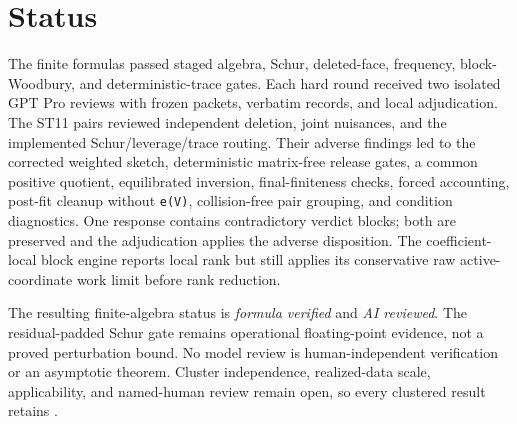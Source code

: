 \documentclass[11pt]{article}
\begin{document}
\section{Status}

The finite formulas passed staged algebra, Schur, deleted-face, frequency,
block-Woodbury, and deterministic-trace gates. Each hard round received two
isolated GPT Pro reviews with frozen packets, verbatim records, and local
adjudication. The ST11 pairs reviewed independent deletion, joint nuisances,
and the implemented Schur/leverage/trace routing. Their adverse findings led
to the corrected weighted sketch, deterministic matrix-free release gates, a
common positive quotient, equilibrated inversion, final-finiteness checks,
forced accounting, post-fit cleanup without \texttt{e(V)}, collision-free pair
grouping, and condition diagnostics. One response contains contradictory
verdict blocks; both are preserved and the adjudication applies the adverse
disposition. The coefficient-local block engine reports local rank but still
applies its conservative raw active-coordinate work limit before rank
reduction.

The resulting finite-algebra status is \emph{formula verified} and
\emph{AI reviewed}. The residual-padded Schur gate remains operational
floating-point evidence, not a proved perturbation bound. No model review is
human-independent verification or an asymptotic theorem. Cluster independence,
realized-data scale, applicability, and named-human review remain open, so
every clustered result retains
.
\end{document}
